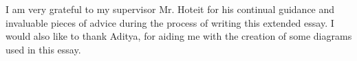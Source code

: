 \documentclass[12pt, oneside]{article}
\begin{document}
I am very grateful to my supervisor Mr. Hoteit for his continual guidance and invaluable pieces of advice during the process of writing this extended essay. I would also like to thank Aditya, for aiding me with the creation of some diagrams used in this essay.

\clearpage

\printbibliography[heading=bibintoc]{}


\clearpage

\begin{appendices}
    \pagestyle{appendices}
    
\end{appendices}
\end{document}
